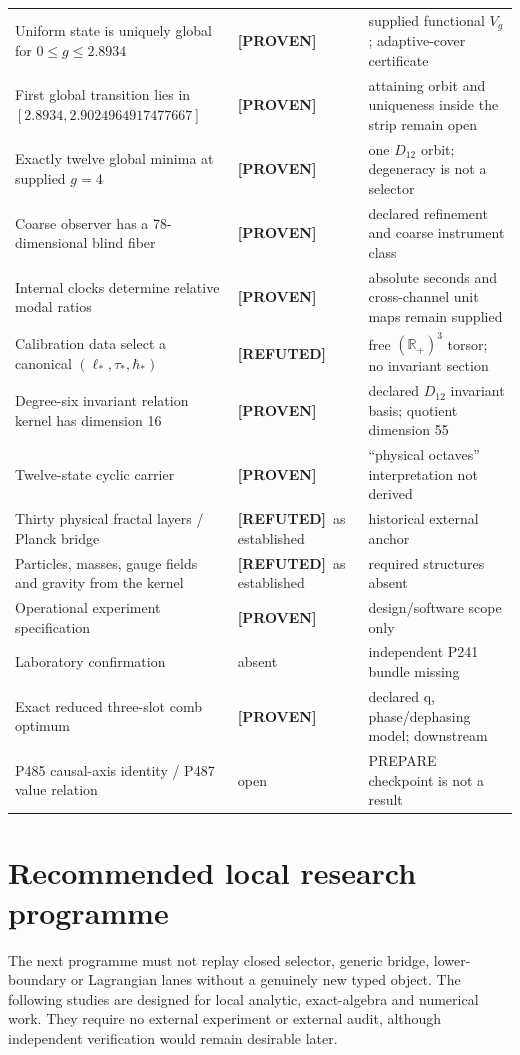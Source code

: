 \documentclass[11pt,a4paper]{article}
\theoremstyle{definition}
\theoremstyle{remark}
\newcommand{\R}{\mathbb R}
\newcommand{\status}[2]{\textcolor{#1}{\textbf{[#2]}}}
\newcommand{\proven}{\status{fingreen}{PROVEN}}
\newcommand{\refuted}{\status{finred}{REFUTED}}
\begin{document}
\begin{longtable}{@{}p{}p{}p{}@{}}
Uniform state is uniquely global for $0\le g\le2.8934$ & \proven & supplied functional $V_g$; adaptive-cover certificate\\
First global transition lies in $[2.8934,2.9024964917477667]$ & \proven & attaining orbit and uniqueness inside the strip remain open\\
Exactly twelve global minima at supplied $g=4$ & \proven & one $D_{12}$ orbit; degeneracy is not a selector\\
Coarse observer has a 78-dimensional blind fiber & \proven & declared refinement and coarse instrument class\\
Internal clocks determine relative modal ratios & \proven & absolute seconds and cross-channel unit maps remain supplied\\
Calibration data select a canonical $(\ell_*,\tau_*,\hbar_*)$ & \refuted & free $(\R_+)^3$ torsor; no invariant section\\
Degree-six invariant relation kernel has dimension 16 & \proven & declared $D_{12}$ invariant basis; quotient dimension 55\\
Twelve-state cyclic carrier & \proven & ``physical octaves'' interpretation not derived\\
Thirty physical fractal layers / Planck bridge & \refuted\ as established & historical external anchor\\
Particles, masses, gauge fields and gravity from the kernel & \refuted\ as established & required structures absent\\
Operational experiment specification & \proven & design/software scope only\\
Laboratory confirmation & absent & independent P241 bundle missing\\
Exact reduced three-slot comb optimum & \proven & declared q, phase/dephasing model; downstream\\
P485 causal-axis identity / P487 value relation & open & PREPARE checkpoint is not a result\\
\bottomrule
\end{longtable}

\section{Recommended local research programme}

The next programme must not replay closed selector, generic bridge, lower-boundary or Lagrangian lanes without a genuinely new typed object. The following studies are designed for local analytic, exact-algebra and numerical work. They require no external experiment or external audit, although independent verification would remain desirable later.
\end{document}
